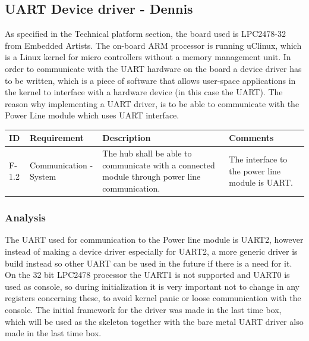 \subsection{UART Device driver - Dennis} 
As specified in the Technical platform section, the board used is LPC2478-32 from Embedded Artists. The on-board ARM processor is running uClinux, which is a Linux kernel for micro controllers without a memory management unit. In order to communicate with the UART hardware on the board a device driver has to be written, which is a piece of software that allows user-space applications in the kernel to interface with a hardware device (in this case the UART). The reason why implementing a UART driver, is to be able to communicate with the Power Line module which uses UART interface. 
\begin{table}[H]
\centering
	\begin{tabular}{|p{1.2cm}|p{2.3cm}|p{6cm}|p{6cm}|}
	\hline
	ID		& Requirement		& Description												& Comments\\\hline
	F-1.2		& Communication - System & The hub shall be able to communicate with a connected module through power line communication. & The interface to the power line module is UART.\\\hline
	\end{tabular}
\end{table}
\subsubsection{Analysis}
The UART used for communication to the Power line module is UART2, however instead of making a device driver especially for UART2, a more generic driver is build instead so other UART can be used in the future if there is a need for it. 
\p On the 32 bit LPC2478 processor the UART1 is not supported and UART0 is used as console, so during initialization it is very important not to change in any registers concerning these, to avoid kernel panic or loose communication with the console.
\p The initial framework for the driver was made in the last time box, which will be used as the skeleton together with the bare metal UART driver also made in the last time box. 

%
